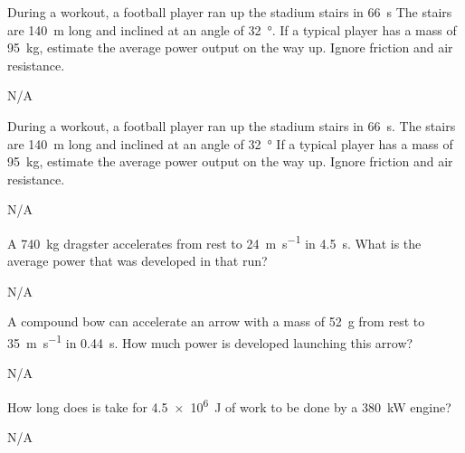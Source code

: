 \begin{question}[ID=power-B-Q03,topic=power,difficulty=B]
    During a workout, a football player ran up the stadium
        stairs in \SI{66}{\second}
    The stairs are \SI{140}{\meter} long and inclined at
        an angle of \SI{32}{\degree}.
    If a typical player has a mass of \SI{95}{\kilo\gram},
        estimate the average power output on the way up.
    Ignore friction and air resistance.
\end{question}
\begin{solution}
    N/A
\end{solution}


\begin{question}[ID=power-B-Q04,topic=power,difficulty=B]
    During a workout, a football player ran up the stadium
        stairs in \SI{66}{\second}.
    The stairs are \SI{140}{\meter} long and inclined at
        an angle of \SI{32}{\degree}
    If a typical player has a mass of \SI{95}{\kilo\gram},
        estimate the average power output on the way up.
    Ignore friction and air resistance.
\end{question}
\begin{solution}
    N/A
\end{solution}


\begin{question}[ID=power-B-Q05,topic=power,difficulty=B]
    A \SI{740}{\kilo\gram} dragster accelerates from rest
        to \SI{24}{\meter\per\second} in \SI{4.5}{\second}.
    What is the average power that was developed in that run?
\end{question}
\begin{solution}
    N/A
\end{solution}


\begin{question}[ID=power-B-Q06,topic=power,difficulty=B]
    A compound bow can accelerate an arrow with a mass of
        \SI{52}{\gram} from rest to \SI{35}{\meter\per\second}
        in \SI{0.44}{\second}.
    How much power is developed launching this arrow?
\end{question}
\begin{solution}
    N/A
\end{solution}


\begin{question}[ID=power-C-Q01,topic=power,difficulty=C]
    How long does is take for \SI{4.5e6}{\joule} of work to be
        done by a \SI{380}{\kilo\watt} engine?
\end{question}
\begin{solution}
    N/A
\end{solution}


